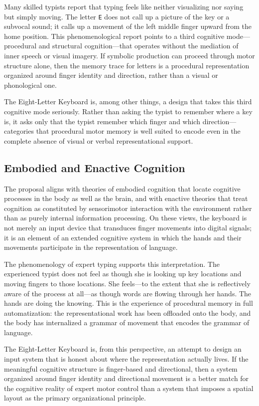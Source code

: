 \documentclass[12pt,a4paper]{article}
\theoremstyle{plain}
\theoremstyle{definition}
\theoremstyle{remark}
\begin{document}
Many skilled typists report that typing feels like neither visualizing nor
saying but simply moving. The letter \texttt{E} does not call up a picture
of the key or a subvocal sound; it calls up a movement of the left middle
finger upward from the home position. This phenomenological report points to a
third cognitive mode---procedural and structural cognition---that operates
without the mediation of inner speech or visual imagery. If symbolic production
can proceed through motor structure alone, then the memory trace for letters
is a procedural representation organized around finger identity and direction,
rather than a visual or phonological one.

The Eight-Letter Keyboard is, among other things, a design that takes this
third cognitive mode seriously. Rather than asking the typist to remember where
a key is, it asks only that the typist remember which finger and which
direction---categories that procedural motor memory is well suited to encode
even in the complete absence of visual or verbal representational support.

\subsection{Embodied and Enactive Cognition}

The proposal aligns with theories of embodied cognition that locate cognitive
processes in the body as well as the brain, and with enactive theories that
treat cognition as constituted by sensorimotor interaction with the environment
rather than as purely internal information processing. On these views, the
keyboard is not merely an input device that transduces finger movements into
digital signals; it is an element of an extended cognitive system in which the
hands and their movements participate in the representation of language.

The phenomenology of expert typing supports this interpretation. The experienced
typist does not feel as though she is looking up key locations and moving fingers
to those locations. She feels---to the extent that she is reflectively aware of
the process at all---as though words are flowing through her hands. The hands
are doing the knowing. This is the experience of procedural memory in full
automatization: the representational work has been offloaded onto the body, and
the body has internalized a grammar of movement that encodes the grammar of
language.

The Eight-Letter Keyboard is, from this perspective, an attempt to design an
input system that is honest about where the representation actually lives. If
the meaningful cognitive structure is finger-based and directional, then a
system organized around finger identity and directional movement is a better
match for the cognitive reality of expert motor control than a system that
imposes a spatial layout as the primary organizational principle.
\end{document}
